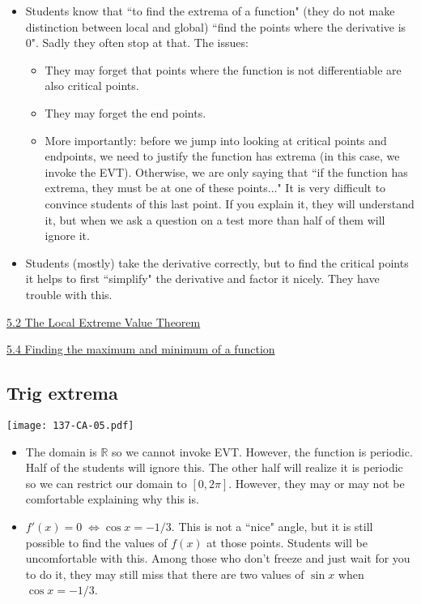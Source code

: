 \documentclass[11pt]{article}
\newcommand {\DS} [1] {${\displaystyle #1}$}
\newcommand{\nl}{\hfill \vspace{-1.1\baselineskip}} %
\newcommand{\vii}{\hspace{8mm} \href{https://www.youtube.com/watch?v=_z8OglXFIq8&list=PLlwePzQY_wW9m5oabUf6hvfVfAaA9uAwM&index=2}{5.2 The Local Extreme Value Theorem}}
\newcommand{\viv}{\hspace{8mm} \href{https://www.youtube.com/watch?v=_giwkVIFeGY&list=PLlwePzQY_wW9m5oabUf6hvfVfAaA9uAwM&index=4}{5.4 Finding the maximum and minimum of a function}}
\begin{document}
\begin{comments}
\nl
\begin{itemize}
\item Students know that ``to find the extrema of a function" (they do not make distinction between local and global) ``find the points where the derivative is 0".  Sadly they often stop at that.    The issues:
	\begin{itemize}
		\item  They may forget that points where the function is not differentiable are also critical points.
		\item  They may forget the end points.
		\item  More importantly: before we jump into looking at critical points and endpoints, we need to justify the function has extrema (in this case, we invoke the EVT).
 Otherwise, we are only saying that ``if the function has extrema, they must be at one of these points..."  It is very difficult to convince students of this last point.  If you explain it, they will understand it, but when we ask a question on a test more than half of them will ignore it.
	\end{itemize}
\item Students (mostly) take the derivative correctly, but to find the critical points it helps to first ``simplify" the derivative and factor it nicely.  They have trouble with this.
\end{itemize}	
\end{comments}

\begin{videos}
\vii

\viv
\end{videos}

\newpage
\subsection{Trig extrema}

\begin{center}
{ \texttt{[image: 137-CA-05.pdf]}} 
\end{center}

\vspace{-2cm}

\begin{comments}
\nl
\begin{itemize}
	\item  The domain is $\mathbb{R}$ so we cannot invoke EVT.  However, the function is periodic.  Half of the students will ignore this.  The other half will realize it is periodic so we can restrict our domain to $[0, 2\pi]$.  However, they may or may not be comfortable explaining why this is.
	\item  \DS{f'(x) = 0 \; \iff \cos x = -1/3}.  This is not a ``nice" angle, but it is still possible to find the values of $f(x)$ at those points.  Students will be uncomfortable with this.  Among those who don't freeze and just wait for you to do it, they may still miss that there are two values of $\sin x$ when $\cos x = -1/3$.
\end{itemize}	
\end{comments}
\end{document}
